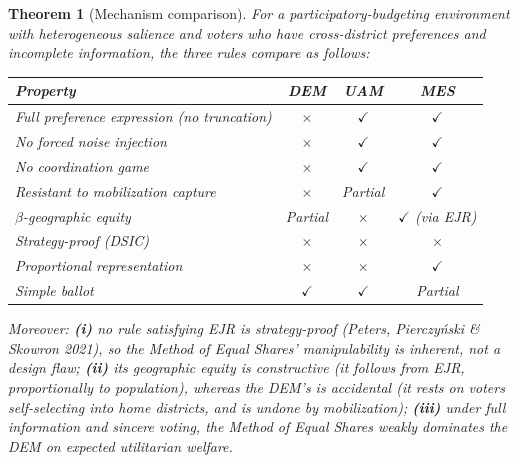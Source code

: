\documentclass[11pt,letterpaper]{article}
\theoremstyle{definition}
\theoremstyle{plain}
\newtheorem{theorem}{Theorem}[section]
\theoremstyle{remark}
\providecommand{\citealp}[1]{Peters, Pierczy\'nski \& Skowron 2021}
\begin{document}
\begin{theorem}[Mechanism comparison]
\label{thm:comp}
For a participatory-budgeting environment with heterogeneous salience and voters who have
cross-district preferences and incomplete information, the three rules compare as follows:
\begin{center}\small\renewcommand{\arraystretch}{1.2}
\begin{tabular}{p{6.6cm}ccc}
\toprule
\textbf{Property} & \textbf{DEM} & \textbf{UAM} & \textbf{MES}\\
\midrule
Full preference expression (no truncation) & $\times$ & $\checkmark$ & $\checkmark$\\
No forced noise injection & $\times$ & $\checkmark$ & $\checkmark$\\
No coordination game & $\times$ & $\checkmark$ & $\checkmark$\\
Resistant to mobilization capture & $\times$ & Partial & $\checkmark$\\
$\beta$-geographic equity & Partial & $\times$ & $\checkmark$ (via EJR)\\
Strategy-proof (DSIC) & $\times$ & $\times$ & $\times$\\
Proportional representation & $\times$ & $\times$ & $\checkmark$\\
Simple ballot & $\checkmark$ & $\checkmark$ & Partial\\
\bottomrule
\end{tabular}
\end{center}
Moreover: \textbf{(i)} no rule satisfying EJR is strategy-proof (\citealp{peters2021}), so the
Method of Equal Shares' manipulability is inherent, not a design flaw; \textbf{(ii)} its geographic
equity is \emph{constructive} (it follows from EJR, proportionally to population), whereas the DEM's
is \emph{accidental} (it rests on voters self-selecting into home districts, and is undone by
mobilization); \textbf{(iii)} under full information and sincere voting, the Method of Equal Shares
weakly dominates the DEM on \emph{expected utilitarian welfare}.
\end{theorem}
\end{document}
